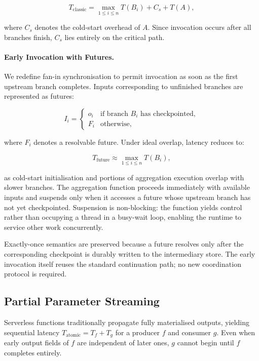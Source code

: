 \documentclass[runningheads]{llncs}
\begin{document}
\begin{equation}
T_{\text{classic}} = \max_{1 \le i \le n} T(B_i) + C_s + T(A),
\end{equation}

where $C_s$ denotes the cold-start overhead of $A$. Since invocation occurs after all branches finish, $C_s$ lies entirely on the critical path.

\paragraph{Early Invocation with Futures.}
We redefine fan-in synchronisation to permit invocation as soon as the first upstream branch completes. Inputs corresponding to unfinished branches are represented as futures:

\[
I_i =
\begin{cases}
o_i & \text{if branch } B_i \text{ has checkpointed}, \\
F_i & \text{otherwise,}
\end{cases}
\]

where $F_i$ denotes a resolvable future. Under ideal overlap, latency reduces to:

\begin{equation}
T_{\text{future}} \approx \max_{1 \le i \le n} T(B_i),
\end{equation}

as cold-start initialisation and portions of aggregation execution overlap with slower branches. The aggregation function proceeds immediately with available inputs and suspends only when it accesses a future whose upstream branch has not yet checkpointed. Suspension is non-blocking: the function yields control rather than occupying a thread in a busy-wait loop, enabling the runtime to service other work concurrently.

Exactly-once semantics are preserved because a future resolves only after the corresponding checkpoint is durably written to the intermediary store. The early invocation itself reuses the standard continuation path; no new coordination protocol is required.

\subsection{Partial Parameter Streaming}

Serverless functions traditionally propagate fully materialised outputs, yielding sequential latency $T_{\text{atomic}} = T_f + T_g$ for a producer $f$ and consumer $g$. Even when early output fields of $f$ are independent of later ones, $g$ cannot begin until $f$ completes entirely.
\end{document}
